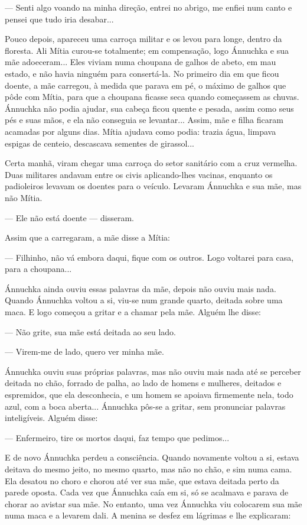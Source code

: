 --- Senti algo voando na minha direção, entrei no abrigo, me enfiei num
canto e pensei que tudo iria desabar...

Pouco depois, apareceu uma carroça militar e os levou para longe, dentro
da floresta. Ali Mítia curou-se totalmente; em compensação, logo
Ánnuchka e sua mãe adoeceram... Eles viviam numa choupana de galhos de
abeto, em mau estado, e não havia ninguém para consertá-la. No primeiro
dia em que ficou doente, a mãe carregou, à medida que parava em pé, o
máximo de galhos que pôde com Mítia, para que a choupana ficasse seca
quando começassem as chuvas. Ánnuchka não podia ajudar, sua cabeça ficou
quente e pesada, assim como seus pés e suas mãos, e ela não conseguia se
levantar... Assim, mãe e filha ficaram acamadas por alguns dias. Mítia
ajudava como podia: trazia água, limpava espigas de centeio, descascava
sementes de girassol...

Certa manhã, viram chegar uma carroça do setor sanitário com a cruz
vermelha. Duas militares andavam entre os civis aplicando-lhes vacinas,
enquanto os padioleiros levavam os doentes para o veículo. Levaram
Ánnuchka e sua mãe, mas não Mítia.

--- Ele não está doente --- disseram.

Assim que a carregaram, a mãe disse a Mítia:

--- Filhinho, não vá embora daqui, fique com os outros. Logo voltarei
para casa, para a choupana...

Ánnuchka ainda ouviu essas palavras da mãe, depois não ouviu mais nada.
Quando Ánnuchka voltou a si, viu-se num grande quarto, deitada sobre uma
maca. E logo começou a gritar e a chamar pela mãe. Alguém lhe disse:

--- Não grite, sua mãe está deitada ao seu lado.

--- Virem-me de lado, quero ver minha mãe.

Ánnuchka ouviu suas próprias palavras, mas não ouviu mais nada até se
perceber deitada no chão, forrado de palha, ao lado de homens e
mulheres, deitados e espremidos, que ela desconhecia, e um homem se
apoiava firmemente nela, todo azul, com a boca aberta... Ánnuchka pôs-se
a gritar, sem pronunciar palavras inteligíveis. Alguém disse:

--- Enfermeiro, tire os mortos daqui, faz tempo que pedimos...

E de novo Ánnuchka perdeu a consciência. Quando novamente voltou a si,
estava deitava do mesmo jeito, no mesmo quarto, mas não no chão, e sim
numa cama. Ela desatou no choro e chorou até ver sua mãe, que estava
deitada perto da parede oposta. Cada vez que Ánnuchka caía em si, só se
acalmava e parava de chorar ao avistar sua mãe. No entanto, uma vez
Ánnuchka viu colocarem sua mãe numa maca e a levarem dali. A menina se
desfez em lágrimas e lhe explicaram:

